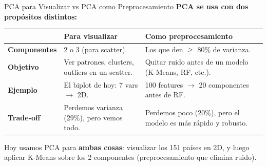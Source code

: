 \documentclass[aspectratio=169, 11pt]{beamer}
\begin{document}
\begin{frame}{PCA para Visualizar vs PCA como Preprocesamiento}
  \vspace{-4pt}
  {\footnotesize\color{arcaDark}\bfseries
    PCA se usa con dos prop\'ositos distintos:}

  \vspace{6pt}
  {\scriptsize
  \begin{tabular}{@{}p{3.5cm}p{4.5cm}p{4.5cm}@{}}
    \toprule
     & \textbf{\color{codeBlue}Para visualizar} & \textbf{\color{arcaRed}Como preprocesamiento} \\
    \midrule
    \textbf{Componentes} & 2 o 3 (para scatter). & Los que den $\geq$ 80\% de varianza. \\
    \textbf{Objetivo} & Ver patrones, clusters, outliers en un scatter. & Quitar ruido antes de un modelo (K-Means, RF, etc.). \\
    \textbf{Ejemplo} & El biplot de hoy: 7 vars $\to$ 2D. & 100 features $\to$ 20 componentes antes de RF. \\
    \textbf{Trade-off} & Perdemos varianza (29\%), pero vemos todo. & Perdemos poco (20\%), pero el modelo es m\'as r\'apido y robusto. \\
    \bottomrule
  \end{tabular}
  }

  \vspace{6pt}
  {\scriptsize\color{textMuted}
    \faLightbulb\hspace{4pt} Hoy usamos PCA para \textbf{ambas cosas}:
    visualizar los 151 pa\'ises en 2D, y luego aplicar K-Means sobre
    los 2 componentes (preprocesamiento que elimina ruido).}
\end{frame}
\end{document}
